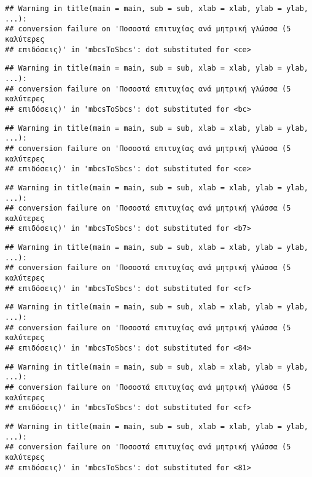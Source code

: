 \documentclass[
]{article}
\begin{document}
\begin{verbatim}
## Warning in title(main = main, sub = sub, xlab = xlab, ylab = ylab, ...):
## conversion failure on 'Ποσοστά επιτυχίας ανά μητρική γλώσσα (5 καλύτερες
## επιδόσεις)' in 'mbcsToSbcs': dot substituted for <ce>
\end{verbatim}

\begin{verbatim}
## Warning in title(main = main, sub = sub, xlab = xlab, ylab = ylab, ...):
## conversion failure on 'Ποσοστά επιτυχίας ανά μητρική γλώσσα (5 καλύτερες
## επιδόσεις)' in 'mbcsToSbcs': dot substituted for <bc>
\end{verbatim}

\begin{verbatim}
## Warning in title(main = main, sub = sub, xlab = xlab, ylab = ylab, ...):
## conversion failure on 'Ποσοστά επιτυχίας ανά μητρική γλώσσα (5 καλύτερες
## επιδόσεις)' in 'mbcsToSbcs': dot substituted for <ce>
\end{verbatim}

\begin{verbatim}
## Warning in title(main = main, sub = sub, xlab = xlab, ylab = ylab, ...):
## conversion failure on 'Ποσοστά επιτυχίας ανά μητρική γλώσσα (5 καλύτερες
## επιδόσεις)' in 'mbcsToSbcs': dot substituted for <b7>
\end{verbatim}

\begin{verbatim}
## Warning in title(main = main, sub = sub, xlab = xlab, ylab = ylab, ...):
## conversion failure on 'Ποσοστά επιτυχίας ανά μητρική γλώσσα (5 καλύτερες
## επιδόσεις)' in 'mbcsToSbcs': dot substituted for <cf>
\end{verbatim}

\begin{verbatim}
## Warning in title(main = main, sub = sub, xlab = xlab, ylab = ylab, ...):
## conversion failure on 'Ποσοστά επιτυχίας ανά μητρική γλώσσα (5 καλύτερες
## επιδόσεις)' in 'mbcsToSbcs': dot substituted for <84>
\end{verbatim}

\begin{verbatim}
## Warning in title(main = main, sub = sub, xlab = xlab, ylab = ylab, ...):
## conversion failure on 'Ποσοστά επιτυχίας ανά μητρική γλώσσα (5 καλύτερες
## επιδόσεις)' in 'mbcsToSbcs': dot substituted for <cf>
\end{verbatim}

\begin{verbatim}
## Warning in title(main = main, sub = sub, xlab = xlab, ylab = ylab, ...):
## conversion failure on 'Ποσοστά επιτυχίας ανά μητρική γλώσσα (5 καλύτερες
## επιδόσεις)' in 'mbcsToSbcs': dot substituted for <81>
\end{verbatim}
\end{document}
